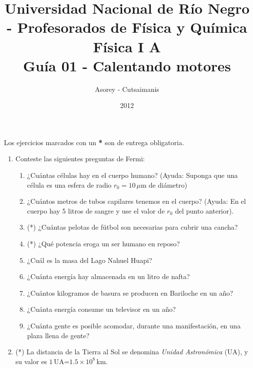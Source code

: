\documentclass[a4paper,12pt]{article}
\begin{document}
\title{
{\normalsize{Universidad Nacional de Río Negro - Profesorados de Física y Química}}\\
Física I A \\ Guía 01 - Calentando motores\\}
\author{Asorey - Cutsaimanis}
\date{2012}
\maketitle

Los ejercicios marcados con un {\bf{*}} son de entrega obligatoria.

\begin{enumerate}
\setcounter{enumi}{0}      %

\item Conteste las siguientes preguntas de Fermi:

\begin{enumerate}
\item ¿Cuántas células hay en el cuerpo humano? (Ayuda: Suponga que una célula
es una esfera de radio $r_0=10$\,$\mu$m de diámetro)
\item ¿Cuántos metros de tubos capilares tenemos en el cuerpo? (Ayuda: En el
cuerpo hay 5 litros de sangre y use el valor de $r_0$ del punto anterior).
\item (*) ¿Cuántas pelotas de fútbol son necesarias para cubrir una cancha?
\item (*) ¿Qué potencia eroga un ser humano en reposo?
\item ¿Cuál es la masa del Lago Nahuel Huapi?
\item ¿Cuánta energía hay almacenada en un litro de nafta?
\item ¿Cuántos kilogramos de basura se producen en Bariloche en un año?
\item ¿Cuánta energía consume un televisor en un año?
\item ¿Cuánta gente es posible acomodar, durante una manifestación, en una
plaza llena de gente?

\end{enumerate}

\item (*) La distancia de la Tierra al Sol se denomina {\emph {Unidad Astronómica}} (UA), y su valor es $1$\,UA=$1.5\times10^8$\,km. 


\end{enumerate}
\end{document}
